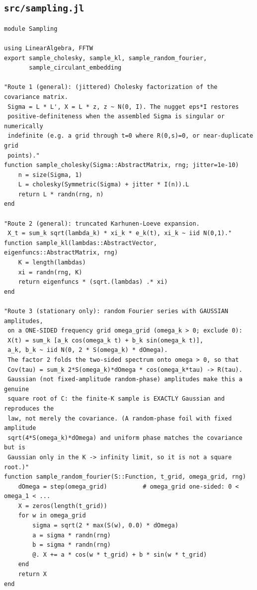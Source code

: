 \documentclass[11pt]{article}
\begin{document}
\subsection*{\texttt{src/sampling.jl}}
\begin{lstlisting}
module Sampling

using LinearAlgebra, FFTW
export sample_cholesky, sample_kl, sample_random_fourier,
       sample_circulant_embedding

"Route 1 (general): (jittered) Cholesky factorization of the covariance matrix.
 Sigma = L * L', X = L * z, z ~ N(0, I). The nugget eps*I restores
 positive-definiteness when the assembled Sigma is singular or numerically
 indefinite (e.g. a grid through t=0 where R(0,s)=0, or near-duplicate grid
 points)."
function sample_cholesky(Sigma::AbstractMatrix, rng; jitter=1e-10)
    n = size(Sigma, 1)
    L = cholesky(Symmetric(Sigma) + jitter * I(n)).L
    return L * randn(rng, n)
end

"Route 2 (general): truncated Karhunen-Loeve expansion.
 X_t = sum_k sqrt(lambda_k) * xi_k * e_k(t), xi_k ~ iid N(0,1)."
function sample_kl(lambdas::AbstractVector, eigenfuncs::AbstractMatrix, rng)
    K = length(lambdas)
    xi = randn(rng, K)
    return eigenfuncs * (sqrt.(lambdas) .* xi)
end

"Route 3 (stationary only): random Fourier series with GAUSSIAN amplitudes,
 on a ONE-SIDED frequency grid omega_grid (omega_k > 0; exclude 0):
 X(t) = sum_k [a_k cos(omega_k t) + b_k sin(omega_k t)],
 a_k, b_k ~ iid N(0, 2 * S(omega_k) * dOmega).
 The factor 2 folds the two-sided spectrum onto omega > 0, so that
 Cov(tau) = sum_k 2*S(omega_k)*dOmega * cos(omega_k*tau) -> R(tau).
 Gaussian (not fixed-amplitude random-phase) amplitudes make this a genuine
 square root of C: the finite-K sample is EXACTLY Gaussian and reproduces the
 law, not merely the covariance. (A random-phase foil with fixed amplitude
 sqrt(4*S(omega_k)*dOmega) and uniform phase matches the covariance but is
 Gaussian only in the K -> infinity limit, so it is not a square root.)"
function sample_random_fourier(S::Function, t_grid, omega_grid, rng)
    dOmega = step(omega_grid)          # omega_grid one-sided: 0 < omega_1 < ...
    X = zeros(length(t_grid))
    for w in omega_grid
        sigma = sqrt(2 * max(S(w), 0.0) * dOmega)
        a = sigma * randn(rng)
        b = sigma * randn(rng)
        @. X += a * cos(w * t_grid) + b * sin(w * t_grid)
    end
    return X
end


\end{lstlisting}
\end{document}
